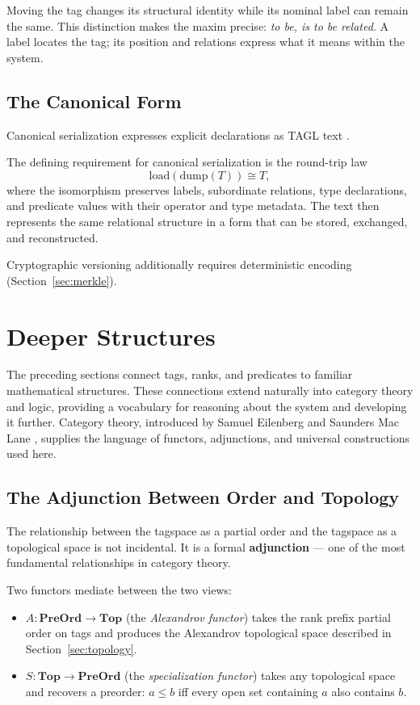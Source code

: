 \documentclass{article}
\begin{document}
Moving the tag changes its structural identity while its nominal label can
remain the same. This distinction makes the maxim precise: \emph{to be, is
to be related}. A label locates the tag; its position and relations express
what it means within the system.

\subsection{The Canonical Form}

Canonical serialization expresses explicit declarations as TAGL text \cite{thesis}.

The defining requirement for canonical serialization is the round-trip law
\[
\mathrm{load}(\mathrm{dump}(T))\cong T,
\]
where the isomorphism preserves labels, subordinate relations, type declarations,
and predicate values with their operator and type metadata.
The text then represents the same relational structure in a form that can
be stored, exchanged, and reconstructed.

Cryptographic versioning additionally requires deterministic encoding
(Section~\ref{sec:merkle}).

\section{Deeper Structures}

The preceding sections connect tags, ranks, and predicates to familiar
mathematical structures. These connections extend naturally into category
theory and logic, providing a vocabulary for reasoning about the system
and developing it further. Category theory, introduced by Samuel Eilenberg
and Saunders Mac Lane \cite{categories}, supplies the language of functors,
adjunctions, and universal constructions used here.

\subsection{The Adjunction Between Order and Topology}\label{sec:adjunction}

The relationship between the tagspace as a partial order and the tagspace as a
topological space is not incidental. It is a formal \textbf{adjunction} --- one
of the most fundamental relationships in category theory.

Two functors mediate between the two views:

\begin{itemize}
  \item $A : \mathbf{PreOrd} \to \mathbf{Top}$ (the \emph{Alexandrov functor})
        takes the rank prefix partial order on tags and produces the Alexandrov
        topological space described in Section~\ref{sec:topology}.
  \item $S : \mathbf{Top} \to \mathbf{PreOrd}$ (the \emph{specialization
        functor}) takes any topological space and recovers a preorder:
        $a \leq b$ iff every open set containing $a$ also contains $b$.
\end{itemize}
\end{document}
